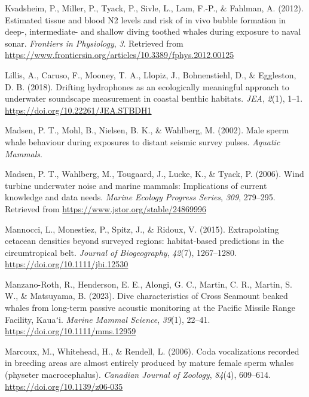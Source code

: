 \documentclass[
]{article}
\newlength{\cslhangindent}
\newlength{\cslentryspacingunit} %
\newenvironment{CSLReferences}[2] %
 {%
  \setlength{\parindent}{0pt}
  \ifodd #1
  \let\oldpar\par
  \def\par{\hangindent=\cslhangindent\oldpar}
  \fi
  \setlength{\parskip}{#2\cslentryspacingunit}
 }%
 {}
\begin{document}
\begin{CSLReferences}{1}{0}
\leavevmode{}%
Kvadsheim, P., Miller, P., Tyack, P., Sivle, L., Lam, F.-P., \& Fahlman,
A. (2012). Estimated tissue and blood N2 levels and risk of in vivo
bubble formation in deep-, intermediate- and shallow diving toothed
whales during exposure to naval sonar. \emph{Frontiers in Physiology},
\emph{3}. Retrieved from
\url{https://www.frontiersin.org/articles/10.3389/fphys.2012.00125}

\leavevmode{}%
Lillis, A., Caruso, F., Mooney, T. A., Llopiz, J., Bohnenstiehl, D., \&
Eggleston, D. B. (2018). Drifting hydrophones as an ecologically
meaningful approach to underwater soundscape measurement in coastal
benthic habitats. \emph{JEA}, \emph{2}(1), 1--1.
\url{https://doi.org/10.22261/JEA.STBDH1}

\leavevmode{}%
Madsen, P. T., Mohl, B., Nielsen, B. K., \& Wahlberg, M. (2002). Male
sperm whale behaviour during exposures to distant seismic survey pulses.
\emph{Aquatic Mammals}.

\leavevmode{}%
Madsen, P. T., Wahlberg, M., Tougaard, J., Lucke, K., \& Tyack, P.
(2006). Wind turbine underwater noise and marine mammals: Implications
of current knowledge and data needs. \emph{Marine Ecology Progress
Series}, \emph{309}, 279--295. Retrieved from
\url{https://www.jstor.org/stable/24869996}

\leavevmode{}%
Mannocci, L., Monestiez, P., Spitz, J., \& Ridoux, V. (2015).
Extrapolating cetacean densities beyond surveyed regions: habitat-based
predictions in the circumtropical belt. \emph{Journal of Biogeography},
\emph{42}(7), 1267--1280. \url{https://doi.org/10.1111/jbi.12530}

\leavevmode{}%
Manzano-Roth, R., Henderson, E. E., Alongi, G. C., Martin, C. R.,
Martin, S. W., \& Matsuyama, B. (2023). Dive characteristics of Cross
Seamount beaked whales from long-term passive acoustic monitoring at the
Pacific Missile Range Facility, Kauaʻi. \emph{Marine Mammal Science},
\emph{39}(1), 22--41. \url{https://doi.org/10.1111/mms.12959}

\leavevmode{}%
Marcoux, M., Whitehead, H., \& Rendell, L. (2006). Coda vocalizations
recorded in breeding areas are almost entirely produced by mature female
sperm whales (physeter macrocephalus). \emph{Canadian Journal of
Zoology}, \emph{84}(4), 609--614. \url{https://doi.org/10.1139/z06-035}


\end{CSLReferences}
\end{document}
